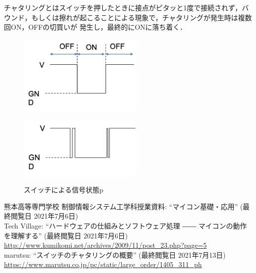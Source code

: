 \documentclass[a4paper,11pt]{jsarticle}
\begin{document}
チャタリングとはスイッチを押したときに接点がピタッと1度で接続されず，バウンド，もしくは擦れが起こることによる現象で，チャタリングが発生時は複数回ON，OFFの切買いが
発生し，最終的にONに落ち着く．
\begin{figure}[H]
  \begin{minipage}{0.48\textwidth}
    \begin{center}
      \includegraphics[clip,width=6cm]{picture/chata1.jpg}
    \end{center}
    \label{chata1}
  \end{minipage}
  \begin{minipage}{0.48\textwidth}
    \begin{center}
      \includegraphics[clip,width=6cm]{picture/chata2.png}
    \end{center}
    \label{chata2}
  \end{minipage}
  \caption{スイッチによる信号状態p}
  \label{P:chata}
\end{figure}



\begin{thebibliography}{99}
   熊本高等専門学校 制御情報システム工学科授業資料: ``マイコン基礎・応用'' (最終閲覧日 2021年7月6日)\\
   Tech Village: ``ハードウェアの仕組みとソフトウェア処理 ―― マイコンの動作を理解する'' (最終閲覧日 2021年7月6日)\\ \url{http://www.kumikomi.net/archives/2009/11/post_23.php?page=5}\\
   marutsu: ``スイッチのチャタリングの概要'' (最終閲覧日 2021年7月13日) \\ \url{https://www.marutsu.co.jp/pc/static/large_order/1405_311_ph}
\end{thebibliography}
\end{document}
